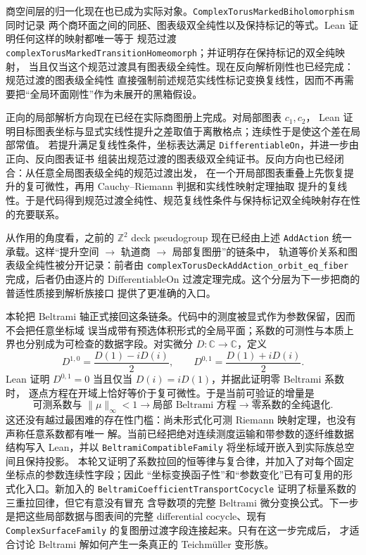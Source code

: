 \documentclass[UTF8,fontset=none,a4paper,11pt]{ctexart}
\begin{document}
商空间层的归一化现在也已成为实际对象。\texttt{ComplexTorusMarkedBiholomorphism} 同时记录
两个商环面之间的同胚、图表级双全纯性以及保持标记的等式。Lean 证明任何这样的映射都唯一等于
规范过渡 \texttt{complexTorusMarkedTransitionHomeomorph}；并证明存在保持标记的双全纯映射，
当且仅当这个规范过渡具有图表级全纯性。现在反向解析刚性也已经完成：规范过渡的图表级全纯性
直接强制前述规范实线性标记变换复线性，因而不再需要把“全局环面刚性”作为未展开的黑箱假设。

正向的局部解析方向现在已经在实际商图册上完成。对局部图表 $c_1,c_2$，
Lean 证明目标图表坐标与显式实线性提升之差取值于离散格点；连续性于是使这个差在局部常值。
若提升满足复线性条件，坐标表达满足 \texttt{DifferentiableOn}，并进一步由正向、反向图表证书
组装出规范过渡的图表级双全纯证书。反向方向也已经闭合：从任意全局图表级全纯的规范过渡出发，
在一个开局部图表重叠上先恢复提升的复可微性，再用 Cauchy--Riemann 判据和实线性映射定理抽取
提升的复线性。于是代码得到规范过渡全纯性、规范复线性条件与保持标记双全纯映射存在性的充要联系。

从作用的角度看，之前的 \(\mathbb Z^2\) deck pseudogroup 现在已经由上述
\texttt{AddAction} 统一承载。这样“提升空间 \(\to\) 轨道商 \(\to\) 局部复图册”的链条中，
轨道等价关系和图表级全纯性被分开记录：前者由
\texttt{complexTorusDeckAddAction\_orbit\_eq\_fiber} 完成，后者仍由逐片的
\(\mathrm{DifferentiableOn}\) 过渡定理完成。这个分层为下一步把商的普适性质接到解析族接口
提供了更准确的入口。

本轮把 Beltrami 轴正式接回这条链条。代码中的测度被显式作为参数保留，因而不会把任意坐标域
误当成带有预选体积形式的全局平面；系数的可测性与本质上界也分别成为可检查的数据字段。对实微分
\(D:\mathbb C\to\mathbb C\)，定义
\[
 D^{1,0}=\frac{D(1)-iD(i)}2,
 \qquad
 D^{0,1}=\frac{D(1)+iD(i)}2.
\]
Lean 证明 $D^{0,1}=0$ 当且仅当 $D(i)=iD(1)$，并据此证明零 Beltrami 系数时，
逐点方程在开域上恰好等价于复可微性。于是当前可验证的增量是
\[
\text{可测系数与 }\|\mu\|_\infty<1
\to
\text{局部 Beltrami 方程}
\to
\text{零系数的全纯退化}.
\]
这还没有越过最困难的存在性门槛：尚未形式化可测 Riemann 映射定理，也没有声称任意系数都有唯一
解。当前已经把绝对连续测度运输和带参数的逐纤维数据结构写入 Lean，并以
\texttt{BeltramiCompatibleFamily} 将坐标域开嵌入到实际族总空间且保持投影。
本轮又证明了系数拉回的恒等律与复合律，并加入了对每个固定坐标点的参数连续性字段；因此
“坐标变换函子性”和“参数变化”已有可复用的形式化入口。新加入的
\texttt{BeltramiCoefficientTransportCocycle} 证明了标量系数的三重拉回律，但它有意没有冒充
含导数项的完整 Beltrami 微分变换公式。下一步是把这些局部数据与图表间的完整 differential
cocycle、现有 \texttt{ComplexSurfaceFamily} 的复图册过渡字段连接起来。只有在这一步完成后，
才适合讨论 Beltrami 解如何产生一条真正的 Teichmüller 变形族。
\end{document}
